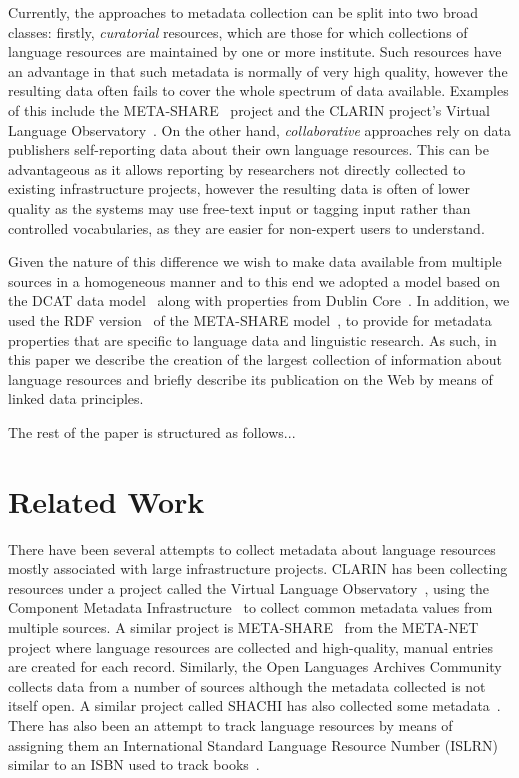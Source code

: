 \documentclass{acm_proc_article-sp}
\begin{document}
Currently, the approaches to metadata collection can be split into two broad
classes: firstly, \emph{curatorial} resources, which are those for which collections of
language resources are maintained by one or more institute. Such resources have
an advantage in that such metadata is normally of very high quality, however the
resulting data often fails to cover the whole spectrum of data available.
Examples of this include the META-SHARE~\cite{federmann2012meta} project and the
CLARIN project's Virtual Language Observatory~\cite[VLO]{van2012semantic}. On
the other hand, \emph{collaborative} approaches rely on data publishers
self-reporting data about their own language resources. This can be advantageous
as it allows reporting by researchers not directly collected to existing
infrastructure projects, however the resulting data is often of lower quality as
the systems may use free-text input or tagging input rather than controlled
vocabularies, as they are easier for non-expert users to understand.

Given the nature of this difference we wish to make data available from multiple
sources in a homogeneous manner and to this end we adopted a model based on the
DCAT data model~\cite{maali2014data} along with properties from Dublin
Core~\cite{weibel1998dublin}. In addition, we used the RDF
version~\cite{mccrae2015ontology} of the META-SHARE
model~\cite{gavrilidou2012meta}, to provide for metadata properties that are
specific to language data and linguistic research. As such, in this paper we
describe the creation of the largest collection of information about language
resources and briefly describe its publication on the Web by means of linked
data principles.

The rest of the paper is structured as follows...

\section{Related Work}

There have been several attempts to collect metadata about language resources
mostly associated with large infrastructure projects. CLARIN has been collecting
resources under a project called the Virtual Language
Observatory~\cite{van2012semantic}, using the Component
Metadata Infrastructure~\cite[CMDI]{broeder2012cmdi} to collect common metadata
values from multiple sources. A similar project is
META-SHARE~\cite{piperidis2012meta} from the META-NET project where language
resources are collected and high-quality, manual entries are created for each
record. Similarly, the Open Languages Archives
Community~\cite[OLAC]{bird2003extending} collects data from a number of sources
although the metadata collected is not itself open. A similar project called
SHACHI has also collected some metadata~\cite{tohyama2008shachi}. There has also
been an attempt to track language resources by means of assigning them an
International Standard Language Resource Number (ISLRN) similar to an ISBN used
to track books~\cite{choukri2012using}.
\end{document}
